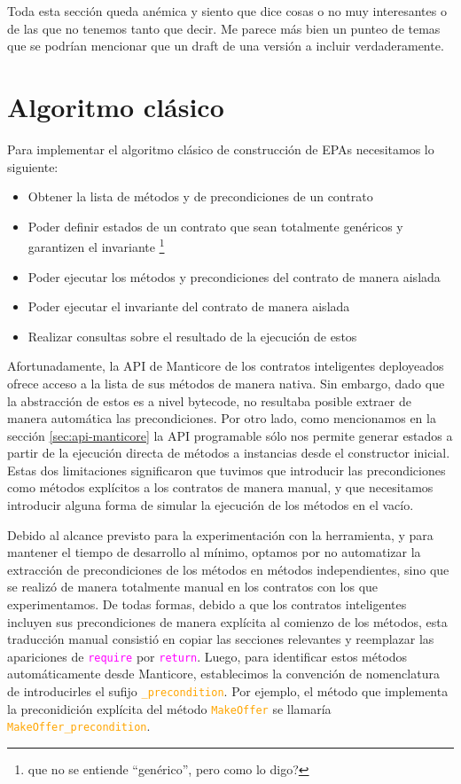 Toda esta sección queda anémica y siento que dice cosas o no muy interesantes o de las que no tenemos tanto que decir.
Me parece más bien un punteo de temas que se podrían mencionar que un draft de una versión a incluir verdaderamente.

\section{Algoritmo clásico}
Para implementar el algoritmo clásico de construcción de EPAs necesitamos lo siguiente:
\begin{itemize}
    \item Obtener la lista de métodos y de precondiciones de un contrato
    \item Poder definir estados de un contrato que sean totalmente genéricos y garantizen el invariante \footnote{que no se entiende ``genérico'', pero como lo digo?}
    \item Poder ejecutar los métodos y precondiciones del contrato de manera aislada
    \item Poder ejecutar el invariante del contrato de manera aislada
    \item Realizar consultas sobre el resultado de la ejecución de estos
\end{itemize}
Afortunadamente, la API de Manticore de los contratos inteligentes deployeados ofrece acceso a la lista de sus métodos de manera nativa.
Sin embargo, dado que la abstracción de estos es a nivel bytecode, no resultaba posible extraer de manera automática las precondiciones.
Por otro lado, como mencionamos en la sección \ref{sec:api-manticore} la API programable sólo nos permite generar estados a partir de la ejecución directa de métodos a instancias desde el constructor inicial.
Estas dos limitaciones significaron que tuvimos que introducir las precondiciones como métodos explícitos a los contratos de manera manual, y que necesitamos introducir alguna forma de simular la ejecución de los métodos en el vacío.

Debido al alcance previsto para la experimentación con la herramienta, y para mantener el tiempo de desarrollo al mínimo, optamos por no automatizar la extracción de precondiciones de los métodos en métodos independientes, sino que se realizó de manera totalmente manual en los contratos con los que experimentamos.
De todas formas, debido a que los contratos inteligentes incluyen sus precondiciones de manera explícita al comienzo de los métodos, esta traducción manual consistió en copiar las secciones relevantes y reemplazar las apariciones de \textcolor{magenta}{\texttt{require}} por \textcolor{magenta}{\texttt{return}}.
Luego, para identificar estos métodos automáticamente desde Manticore, establecimos la convención de nomenclatura de introducirles el sufijo \textcolor{orange}{\texttt{\_precondition}}.
Por ejemplo, el método que implementa la preconidición explícita del método \textcolor{orange}{\texttt{MakeOffer}} se llamaría \textcolor{orange}{\texttt{MakeOffer\_precondition}}.

